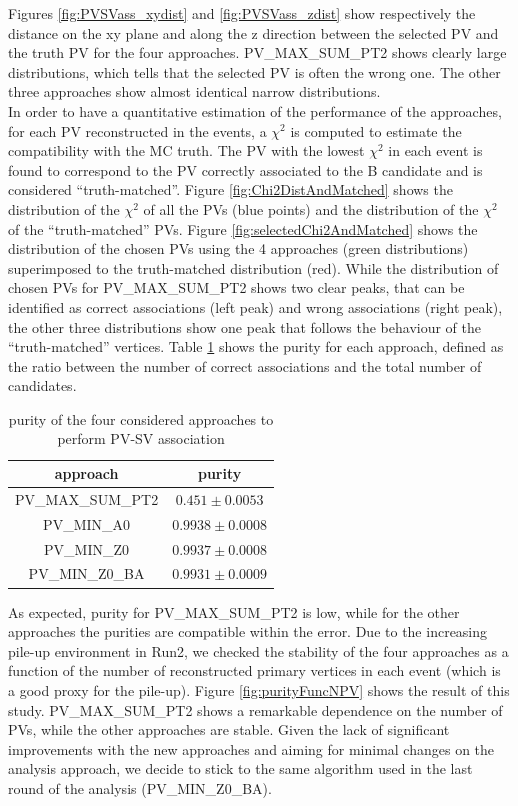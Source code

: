 Figures \ref{fig:PVSVass_xydist} and  \ref{fig:PVSVass_zdist} show respectively the distance on the xy plane and along the z direction between the selected PV and the truth PV for the four approaches.
PV\_MAX\_SUM\_PT2 shows clearly large distributions, which tells that the selected PV is often the wrong one. The other three approaches show almost identical narrow distributions.\\
In order to have a quantitative estimation of the performance of the approaches, for each PV reconstructed in the events, a $\chi^2$ is computed to estimate the compatibility with the MC truth. The PV with the lowest $\chi^2$ in each event is found to correspond to the PV correctly associated to the B candidate and is considered “truth-matched”. Figure \ref{fig:Chi2DistAndMatched} shows the distribution of the $\chi^2$ of all the PVs (blue points) and the distribution of the $\chi^2$ of the “truth-matched” PVs.
Figure \ref{fig:selectedChi2AndMatched} shows the distribution of the chosen PVs using the 4 approaches (green distributions) superimposed to the truth-matched distribution (red). While the distribution of chosen PVs for PV\_MAX\_SUM\_PT2 shows two clear peaks, that can be identified as correct associations (left peak) and wrong associations (right peak), the other three distributions show one peak that follows the behaviour of the “truth-matched” vertices.
Table \ref{table:PVpurity} shows the purity for each approach, defined as the ratio between the number of correct associations and the total number of candidates.
\begin{table}[h]
  \begin{center} 
    \begin{tabular}{| c | c |}
      \hline
      approach & purity  \\ \hline
      PV\_MAX\_SUM\_PT2	 & $0.451	\pm 0.0053$  \\ \hline
      PV\_MIN\_A0	 & $0.9938	\pm 	0.0008$  \\ \hline
      PV\_MIN\_Z0	 & $0.9937	\pm 	0.0008 $ \\ \hline
      PV\_MIN\_Z0\_BA	& $0.9931		\pm 0.0009 $ \\ 
      \hline
    \end{tabular}
    \caption{purity of the four considered approaches to perform PV-SV association}
    \label{table:PVpurity}  
  \end{center}
\end{table}
As expected, purity for PV\_MAX\_SUM\_PT2 is low, while for the other approaches the purities are compatible within the error.
Due to the increasing pile-up environment in Run2, we checked the stability of the four approaches as a function of the number of reconstructed primary vertices in each event (which is a good proxy for the pile-up).
Figure \ref{fig:purityFuncNPV} shows the result of this study. PV\_MAX\_SUM\_PT2 shows a remarkable dependence on the number of PVs, while the other approaches are stable.
Given the lack of significant improvements with the new approaches and aiming for minimal changes on the analysis approach, we decide to stick to the same algorithm used in the last round of the analysis (PV\_MIN\_Z0\_BA).

